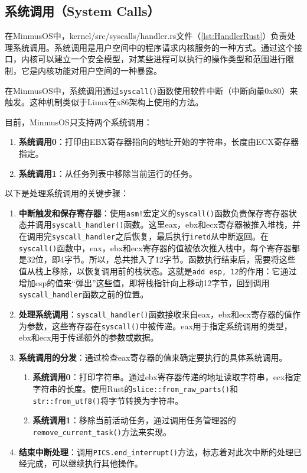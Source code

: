 \subsection{系统调用（System Calls）}

在MinmusOS中，kernel/src/syscalls/handler.rs文件（\cref{lst:HandlerRust}）负责处理系统调用。系统调用是用户空间中的程序请求内核服务的一种方式。通过这个接口，内核可以建立一个安全模型，对某些进程可以执行的操作类型和范围进行限制，它是内核功能对用户空间的一种暴露。

在MinmusOS中，系统调用通过\texttt{syscall()}函数使用软件中断（中断向量0x80）来触发。这种机制类似于Linux在x86架构上使用的方法。

目前，MinmusOS只支持两个系统调用：

\begin{enumerate}
    \item \textbf{系统调用0}：打印由EBX寄存器指向的地址开始的字符串，长度由ECX寄存器指定。
    \item \textbf{系统调用1}：从任务列表中移除当前运行的任务。
\end{enumerate}

以下是处理系统调用的关键步骤：

\begin{enumerate}
    \item \textbf{中断触发和保存寄存器}：使用\texttt{asm!}宏定义的\texttt{syscall()}函数负责保存寄存器状态并调用\texttt{syscall\_handler()}函数。这里eax，ebx和ecx寄存器被推入堆栈，并在调用完\texttt{syscall\_handler}之后恢复，最后执行\texttt{iretd}从中断返回。在\texttt{syscall()}函数中，eax，ebx和ecx寄存器的值被依次推入栈中，每个寄存器都是32位，即4字节。所以，总共推入了12字节。函数执行结束后，需要将这些值从栈上移除，以恢复调用前的栈状态。这就是\texttt{add esp, 12}的作用：它通过增加esp的值来“弹出”这些值，即将栈指针向上移动12字节，回到调用\texttt{syscall\_handler}函数之前的位置。
    \item \textbf{处理系统调用}：\texttt{syscall\_handler()}函数接收来自eax，ebx和ecx寄存器的值作为参数，这些寄存器在\texttt{syscall()}中被传递。eax用于指定系统调用的类型，ebx和ecx用于传递额外的参数或数据。
    \item \textbf{系统调用的分发}：通过检查eax寄存器的值来确定要执行的具体系统调用。
          \begin{enumerate}
              \item \textbf{系统调用0}：打印字符串。通过ebx寄存器传递的地址读取字符串，ecx指定字符串的长度。使用Rust的\texttt{slice::from\_raw\_parts()}和\texttt{str::from\_utf8()}将字节转换为字符串。
              \item \textbf{系统调用1}：移除当前活动任务，通过调用任务管理器的\texttt{remove\_current\_task()}方法来实现。
          \end{enumerate}
    \item \textbf{结束中断处理}：调用\texttt{PICS.end\_interrupt()}方法，标志着对此次中断的处理已经完成，可以继续执行其他操作。
\end{enumerate}

